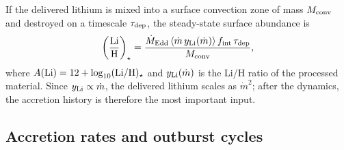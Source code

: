\documentclass[twocolumn,showpacs,preprintnumbers,amsmath,amssymb]{revtex4}
\begin{document}
If the delivered lithium is mixed into a surface convection zone of mass $M_{\rm conv}$ and destroyed on a timescale $\tau_{\rm dep}$, the steady-state surface abundance is
\begin{equation}
\label{eq:ALi}
\left(\frac{\rm Li}{\rm H}\right)_{\star} = \frac{\dot M_{\rm Edd}\,\langle \dot m\, y_{\rm Li}(\dot m)\rangle\, f_{\rm int}\, \tau_{\rm dep}}{M_{\rm conv}} ,
\end{equation}
where $A({\rm Li}) = 12 + \log_{10}({\rm Li/H})_\star$ and $y_{\rm Li}(\dot m)$ is the Li/H ratio of the processed material. Since $y_{\rm Li}\propto\dot m$, the delivered lithium scales as $\dot m^2$; after the dynamics, the accretion history is therefore the most important input.

\subsection{Accretion rates and outburst cycles}
\end{document}
